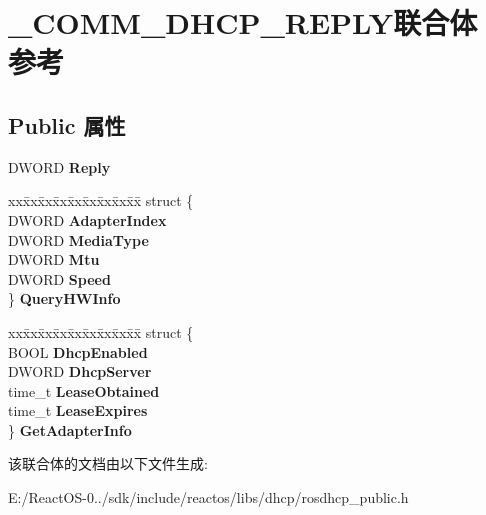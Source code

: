 \hypertarget{union___c_o_m_m___d_h_c_p___r_e_p_l_y}{}\section{\+\_\+\+C\+O\+M\+M\+\_\+\+D\+H\+C\+P\+\_\+\+R\+E\+P\+L\+Y联合体 参考}
\label{union___c_o_m_m___d_h_c_p___r_e_p_l_y}
\subsection*{Public 属性}
\begin{DoxyCompactItemize}
\item 
\mbox{\label{union___c_o_m_m___d_h_c_p___r_e_p_l_y_accb13076258815ed8fa071a4ff713229}} 
D\+W\+O\+RD {\bfseries Reply}
\item 
\mbox{\label{union___c_o_m_m___d_h_c_p___r_e_p_l_y_a34d7f5aa276d342ee8b7ef214d3f90ea}} 
\begin{tabbing}
xx\=xx\=xx\=xx\=xx\=xx\=xx\=xx\=xx\=\kill
struct \{\\
\>DWORD {\bfseries AdapterIndex}\\
\>DWORD {\bfseries MediaType}\\
\>DWORD {\bfseries Mtu}\\
\>DWORD {\bfseries Speed}\\
\} {\bfseries QueryHWInfo}\\

\end{tabbing}\item 
\mbox{\label{union___c_o_m_m___d_h_c_p___r_e_p_l_y_a3917b08fe11f6ba85372ff747ebb6ba5}} 
\begin{tabbing}
xx\=xx\=xx\=xx\=xx\=xx\=xx\=xx\=xx\=\kill
struct \{\\
\>BOOL {\bfseries DhcpEnabled}\\
\>DWORD {\bfseries DhcpServer}\\
\>time\_t {\bfseries LeaseObtained}\\
\>time\_t {\bfseries LeaseExpires}\\
\} {\bfseries GetAdapterInfo}\\

\end{tabbing}\end{DoxyCompactItemize}


该联合体的文档由以下文件生成\+:\begin{DoxyCompactItemize}
\item 
E\+:/\+React\+O\+S-\/0../sdk/include/reactos/libs/dhcp/rosdhcp\+\_\+public.\+h\end{DoxyCompactItemize}
